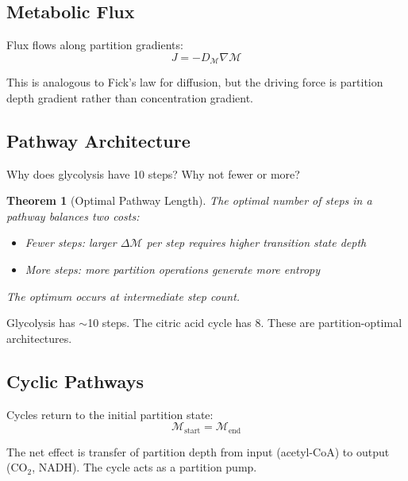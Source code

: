﻿\documentclass[twocolumn,10pt,a4paper]{article}
\newtheorem{theorem}{Theorem}[section]
\theoremstyle{definition}
\theoremstyle{remark}
\newcommand{\Depth}{\mathcal{M}}
\begin{document}
\subsection{Metabolic Flux}

Flux flows along partition gradients:
\begin{equation}
    J = -D_{\Depth} \nabla\Depth
\end{equation}

This is analogous to Fick's law for diffusion, but the driving force is partition depth gradient rather than concentration gradient.

\subsection{Pathway Architecture}

Why does glycolysis have 10 steps? Why not fewer or more?

\begin{theorem}[Optimal Pathway Length]
\label{thm:pathway}
The optimal number of steps in a pathway balances two costs:
\begin{itemize}
    \item Fewer steps: larger $\Delta\Depth$ per step requires higher transition state depth
    \item More steps: more partition operations generate more entropy
\end{itemize}
The optimum occurs at intermediate step count.
\end{theorem}

Glycolysis has $\sim$10 steps. The citric acid cycle has 8. These are partition-optimal architectures.

\subsection{Cyclic Pathways}

Cycles return to the initial partition state:
\begin{equation}
    \Depth_{\mathrm{start}} = \Depth_{\mathrm{end}}
\end{equation}

The net effect is transfer of partition depth from input (acetyl-CoA) to output (CO$_2$, NADH). The cycle acts as a partition pump.
\end{document}
